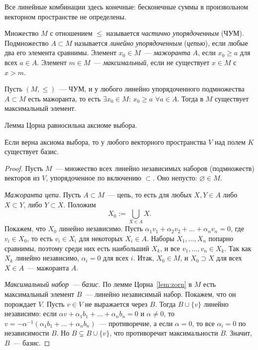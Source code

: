 \documentclass[12pt]{article}
\begin{document}
	\begin{note}
		Все линейные комбинации здесь конечные: бесконечные суммы в произвольном векторном пространстве не определены.
	\end{note}

	\begin{definition}
		Множество $M$ с отношением $\leqslant$ называется \emph{частично упорядоченным} (ЧУМ). Подмножество $A \subset M$ называется \emph{линейно упорядоченным} (\emph{цепью}), если любые два его элемента сравнимы. Элемент $x_0 \in M$~--- \emph{мажоранта} $A$, если $x_0 \geqslant a$ для всех $a \in A$. Элемент $m \in M$~--- \emph{максимальный}, если не существует $x \in M$ с $x > m$.
	\end{definition}

	\begin{lemma}[Цорна]\label{lem:zorn}
		Пусть $(M, \leqslant)$~--- ЧУМ, и у любого линейно упорядоченного подмножества $A \subset M$ есть мажоранта, то есть $\exists x_0 \in M$: $x_0 \geqslant a$ $\forall a \in A$. Тогда в $M$ существует максимальный элемент.
	\end{lemma}

	\begin{note}
		Лемма Цорна равносильна аксиоме выбора.
	\end{note}

	\begin{theorem}\label{thm:basis-exists}
		Если верна аксиома выбора, то у любого векторного пространства $V$ над полем $K$ существует базис.
	\end{theorem}
	\begin{proof}
		Пусть $M$~--- множество всех линейно независимых наборов (подмножеств) векторов из $V$, упорядоченное по включению $\subset$. Оно непусто: $\varnothing \in M$.

		\emph{Мажоранта цепи.} Пусть $A \subset M$~--- цепь, то есть для любых $X, Y \in A$ либо $X \subset Y$, либо $Y \subset X$. Положим
		\[
			X_0 := \bigcup_{X \in A} X.
		\]
		Покажем, что $X_0$ линейно независимо. Пусть $\alpha_1 v_1 + \alpha_2 v_2 + \ldots + \alpha_n v_n = 0$, где $v_i \in X_0$, то есть $v_i \in X_i$ для некоторых $X_i \in A$. Наборы $X_1, \ldots, X_n$ попарно сравнимы, поэтому среди них есть наибольший $X_k$, и все $v_1, \ldots, v_n \in X_k$. Так как $X_k$ линейно независимо, $\alpha_i = 0$ для всех $i$. Итак, $X_0 \in M$, и $X_0 \supset X$ для всех $X \in A$~--- мажоранта $A$.

		\emph{Максимальный набор~--- базис.} По лемме Цорна~\ref{lem:zorn} в $M$ есть максимальный элемент $B$~--- линейно независимый набор. Покажем, что он порождает $V$. Пусть $v \in V$ не выражается через $B$. Тогда $B \cup \{ v \}$ линейно независимо: если $\alpha v + \alpha_1 b_1 + \ldots + \alpha_n b_n = 0$ и $\alpha \ne 0$, то $v = -\alpha^{-1}(\alpha_1 b_1 + \ldots + \alpha_n b_n)$~--- противоречие, а если $\alpha = 0$, то все $\alpha_i = 0$ по независимости $B$. Но $B \subsetneq B \cup \{ v \}$, что противоречит максимальности $B$. Значит, $B$~--- базис.
	\end{proof}
\end{document}
